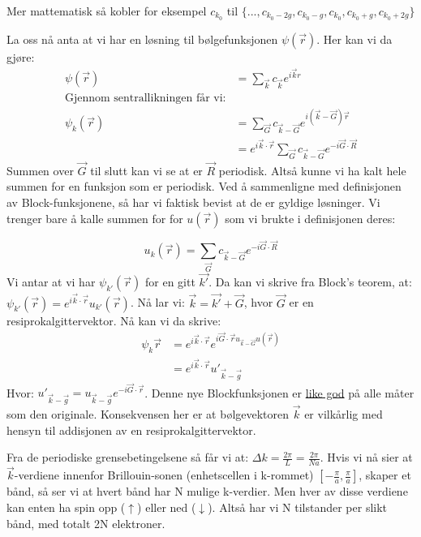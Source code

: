 \documentclass{article}
\begin{document}
Mer mattematisk så kobler for eksempel $c_{k_0}$ til $\{..., c_{k_0 - 2g}, c_{k_0 - g}, c_{k_0}, c_{k_0 + g}, c_{k_0 + 2g}\}$

La oss nå anta at vi har en løsning til bølgefunksjonen $\psi(\vec{r})$.
Her kan vi da gjøre:
\begin{align}
  \psi(\vec{r}) &= \sum_{\vec{k}} c_{\vec{k}} e^{i \vec{k} {r}} \\
  \text{Gjennom sentrallikningen får vi:} \\
   \psi_k(\vec{r})&= \sum_{\vec{G}} c_{\vec{k} - \vec{G}} e^{i(\vec{k} - \vec{G}) 
   \vec{r}} \\
   &= e^{i\vec{k}\cdot\vec{r}} \sum_{\vec{G}}  c_{\vec{k} - \vec{G}}e^{-i \vec{G}\cdot\vec{R}}
\end{align}
Summen over $\vec{G}$ til slutt kan vi se at er $\vec{R}$ periodisk. Altså kunne vi ha kalt hele summen for en funksjon som er periodisk. Ved å sammenligne med definisjonen av Block-funksjonene, så har vi faktisk bevist at de er gyldige løsninger. Vi trenger bare å kalle summen for for $u(\vec{r})$ som vi brukte i definisjonen deres: 

\begin{equation}
  u_k(\vec{r}) = \sum_{\vec{G}} c_{\vec{k} - \vec{G}} e^{-i \vec{G} \cdot \vec{R}}
\end{equation}
Vi antar at vi har $\psi_{k'}(\vec{r})$ for en gitt $\vec{k'}$. Da kan vi skrive fra Block's teorem, at: $\psi_{k'}(\vec{r}) = e^{i\vec{k}\cdot\vec{r}} u_{k'}(\vec{r})$. Nå lar vi: $\vec{k} = \vec{k'} + \vec{G}$, hvor $\vec{G}$ er en resiprokalgittervektor. Nå kan vi da skrive:
\begin{align}
  \psi_k{\vec{r}} &= e^{i \vec{k} \cdot \vec{r}} e^{i \vec{G} \cdot \vec{r} u_{\vec{k} - \vec{G}}u(\vec{r})} \\
  &= e^{i\vec{k}\cdot\vec{r}}{u'}_{\vec{k}-\vec{g}}
\end{align}
Hvor: ${u'}_{\vec{k}-\vec{g}} = {u}_{\vec{k}-\vec{g}} e^{-i \vec{G}\cdot \vec{r}}$.
Denne nye Blockfunksjonen er \underline{like god} på alle måter som den originale. Konsekvensen her er at bølgevektoren $\vec{k}$ er vilkårlig med hensyn til addisjonen av en resiprokalgittervektor.

Fra de periodiske grensebetingelsene så får vi at: $\Delta k = \frac{2\pi}{L} = \frac{2\pi}{Na}$. Hvis vi nå sier at $\vec{k}$-verdiene innenfor  Brillouin-sonen (enhetscellen i k-rommet) $\left[-\frac{\pi}{a}, \frac{\pi}{a} \right]$, skaper et bånd, så ser vi at hvert bånd har N mulige k-verdier. Men hver av disse verdiene kan enten ha spin opp ($\uparrow$) eller ned ($\downarrow$). Altså har vi N tilstander per slikt bånd, med totalt 2N elektroner.
\end{document}
